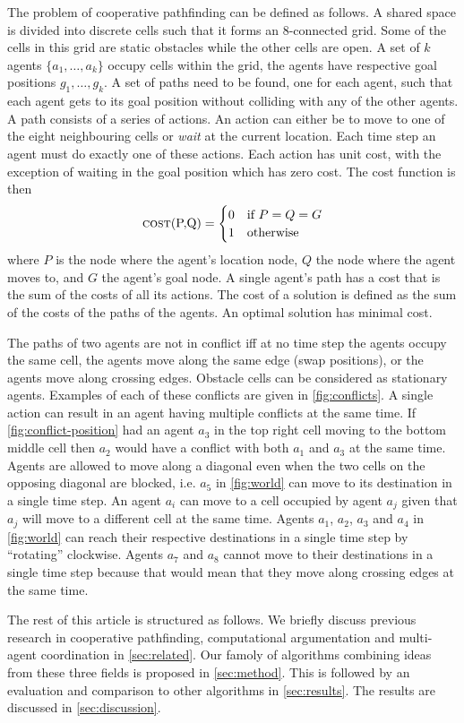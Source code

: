 The problem of cooperative pathfinding can be defined as follows. A shared
space is divided into discrete cells such that it forms an 8-connected grid.
Some of the cells in this grid are static obstacles while the other cells are
open. A set of $k$ agents $\{a_1, \ldots, a_k\}$ occupy cells within the grid,
the agents have respective goal positions $g_1, \ldots, g_k$. A set of paths
need to be found, one for each agent, such that each agent gets to its goal
position without colliding with any of the other agents. A path consists of a
series of actions. An action can either be to move to one of the eight
neighbouring cells or \emph{wait} at the current location. Each time step an
agent must do exactly one of these actions. Each action has unit cost, with the
exception of waiting in the goal position which has zero cost. The cost 
function is then
\[
\text{\textsc{cost}(P,Q)} =
\begin{cases}
0 & \text{if } P = Q = G \\
1 & \text{otherwise}
\end{cases}
\]
where $P$ is the node where the agent's location node, $Q$ the node where the
agent moves to, and $G$ the agent's goal node. A single agent's path has a
cost that is the sum of the costs of all its actions. The cost of a solution is
defined as the sum of the costs of the paths of the agents. An optimal solution 
has minimal cost.

The paths of two agents are not in conflict iff at no time step the agents
occupy the same cell, the agents move along the same edge (swap positions), or
the agents move along crossing edges. Obstacle cells can be considered as
stationary agents. Examples of each of these conflicts are given in
\autoref{fig:conflicts}. A single action can result in an agent having multiple
conflicts at the same time. If \autoref{fig:conflict-position} had an agent
$a_3$ in the top right cell moving to the bottom middle cell then $a_2$ would
have a conflict with both $a_1$ and $a_3$ at the same time. Agents are allowed
to move along a diagonal even when the two cells on the opposing diagonal are
blocked, i.e. $a_5$ in \autoref{fig:world} can move to its destination in a
single time step. An agent $a_i$ can move to a cell occupied by agent $a_j$
given that $a_j$ will move to a different cell at the same time. Agents $a_1$,
$a_2$, $a_3$ and $a_4$ in \autoref{fig:world} can reach their respective
destinations in a single time step by ``rotating'' clockwise. Agents $a_7$ and
$a_8$ cannot move to their destinations in a single time step because that
would mean that they move along crossing edges at the same time.

The rest of this article is structured as follows.
We briefly discuss previous research in cooperative pathfinding, computational 
argumentation and multi-agent coordination in \autoref{sec:related}. Our famoly 
of algorithms combining ideas from these three fields is proposed in 
\autoref{sec:method}. This is followed by an evaluation and comparison to other 
algorithms in \autoref{sec:results}. The results are discussed in 
\autoref{sec:discussion}.
